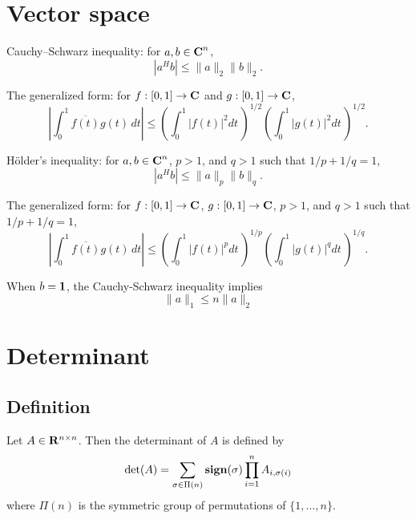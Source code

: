 \section{Vector space}

Cauchy–Schwarz inequality: for $a,b\in{\mbox{\bf C}}^n$,
\begin{equation}
|a^H b| \leq \|a\|_2 \|b\|_2.
\end{equation}

The generalized form:
for $f:[0,1] \to {\mbox{\bf C}}$ and $g:[0,1] \to {\mbox{\bf C}}$,
\begin{equation}
\left|\int_{0}^1 \overline{f(t)} g(t) \, dt \right|
\leq
\left(\int_0^1 |f(t)|^2 dt \, \right)^{1/2}
\left(\int_0^1 |g(t)|^2 dt \, \right)^{1/2}.
\end{equation}

H\"older's inequality: for $a,b\in{\mbox{\bf C}}^n$, $p>1$, and $q>1$ such that $1/p+1/q=1$,
\begin{equation}
|a^H b| \leq \|a\|_p \|b\|_q.
\end{equation}

The generalized form:
for $f:[0,1] \to {\mbox{\bf C}}$, $g:[0,1] \to {\mbox{\bf C}}$,
$p>1$, and $q>1$ such that $1/p+1/q=1$,
\begin{equation}
\left|\int_{0}^1 \overline{f(t)} g(t) \, dt \right|
\leq
\left(\int_0^1 |f(t)|^p dt \, \right)^{1/p}
\left(\int_0^1 |g(t)|^q dt \, \right)^{1/q}.
\end{equation}

When $b=\mathbf 1$, the Cauchy-Schwarz inequality implies
\begin{equation}
\|a\|_1 \leq n \|a\|_2
\end{equation}


\section{Determinant}

\subsection{Definition}

Let $A\in\mathbf{R}^{n\times n}$. Then the determinant of $A$ is defined by
\begin{equation}
\label{eq:def:det}
\det(A) = \sum_{\sigma \in \Pi(n)} {\mathop{\bf sign}}(\sigma) \prod_{i=1}^n A_{i, \sigma(i)}
\end{equation}
where $\Pi(n)$ is the symmetric group of permutations of $\{1, \ldots, n\}$.

